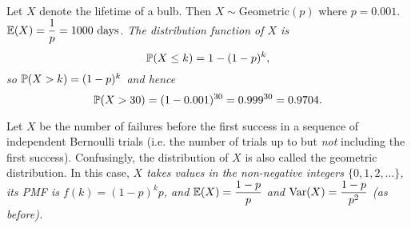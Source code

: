\begin{solution}
Let $X$ denote the lifetime of a bulb. Then $X\sim\text{Geometric}(p)$ where $p=0.001$. 
\ben
\it $\mathbb{E}(X) = \displaystyle\frac{1}{p} = 1000\text{ days}$.
\it The distribution function of $X$ is 
\[
\mathbb{P}(X\leq k) = 1-(1-p)^k,
\]
so $\mathbb{P}(X> k) = (1-p)^k$ and hence
\[
\mathbb{P}(X > 30) = (1 - 0.001)^{30} = 0.999^{30} = 0.9704.
\]
\een
\end{solution}

\begin{remark}
Let $X$ be the number of failures before the first success in a sequence of independent Bernoulli trials (i.e. the number of trials up to but \emph{not} including the first success). Confusingly, the distribution of $X$ is also called the geometric distribution. In this case, 
\bit
\it $X$ takes values in the non-negative integers $\{0,1,2,\ldots\}$, 
\it its PMF is $f(k) = (1-p)^{k}p$, and
\it $\mathbb{E}(X)=\displaystyle\frac{1-p}{p}$ and $\text{Var}(X)=\displaystyle\frac{1-p}{p^2}$ (as before).
\eit
\end{remark}

